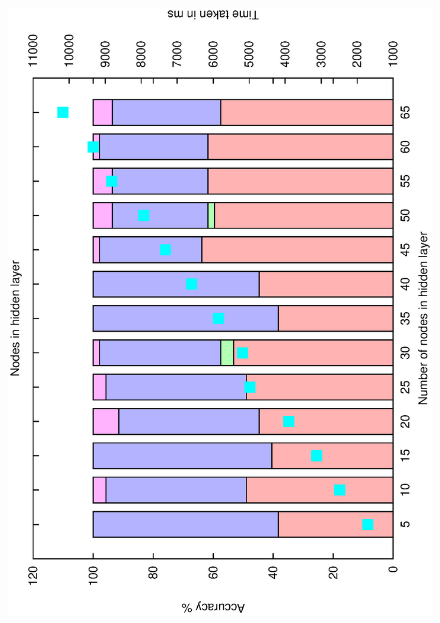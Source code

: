 \documentclass[12pt,a4,notitlepage]{report}
\renewcommand{\_}{\texttt{\symbol{95}}}
\newcommand{\<}{\texttt{\symbol{60}}}
\renewcommand{\>}{\texttt{\symbol{62}}}
\begin{document}
\begin{figure}
\includegraphics[scale=0.3,angle=-90]{results/neural/n_hidden_nodes.ps}

\end{figure}
\end{document}
